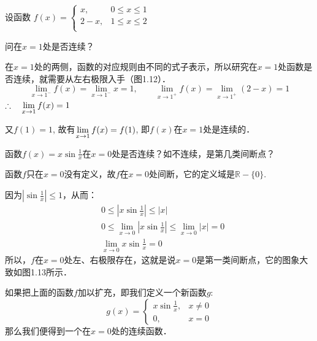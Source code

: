 \begin{example}
    设函数
$f (x) =\begin{cases}
     x,& 0\le x\le 1 \\ 2-x,& 1\le x\le 2\\
\end{cases}$

问在$x=1$处是否连续？
\end{example}

\begin{solution}
  在$x=1$处的两侧，函数的对应规则由不同的式子表示，所以研究在$x=1$处函数是否连续，就需要从左右极限入手（图1.12）．
\[  \lim_{x\to 1^-} f (x) =\lim_{x\to 1^-} x=1,\qquad  \lim_{x\to 1^+} f (x) =\lim_{x\to 1^+} (2-x)=1\]
$\therefore\quad \displaystyle\lim_{x\to 1}f(x)=1$

又$f(1)=1$, 故有$\displaystyle\lim_{x\to 1}f(x)=f(1)$, 即$f(x)$在$x=1$处是连续的．
\end{solution}

\begin{example}
    函数$f(x)=x\sin\frac{1}{x}$在$x=0$处是否连续？如不连续，是第几类间断点？
\end{example}

\begin{solution}
    函数$f$只在$x=0$没有定义，故$f$在$x=0$处间断，它的定义域是$\mathbb{R}-\{0\}$.

因为$\left|\sin\frac{1}{x}\right|\le 1$，从而：    
\[\begin{split}
   & 0\le\left|x\sin\frac{1}{x}\right|\le |x|\\
&0\le \lim_{x\to 0}\left|x\sin\frac{1}{x}\right|\le \lim_{x\to 0}|x|=0\\
&\lim_{x\to 0}x\sin\frac{1}{x}=0
\end{split}\]
所以，$f$在$x=0$处左、右极限存在，这就是说$x=0$是第一类间断点，它的图象大致如图1.13所示．

\begin{figure}[htp]
    \centering
{}
    \caption{}
\end{figure}


如果把上面的函数$f$加以扩充，即我们定义一个新函数$g$:
\[g(x)=\begin{cases}
    x\sin\frac{1}{x},& x\ne 0\\
    0,& x=0
\end{cases}\]
那么我们便得到一个在$x=0$处的连续函数．
\end{solution}

